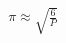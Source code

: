\documentclass[preview]{standalone}
\begin{document}
\begin{align*}
\pi \approx \sqrt{\frac{6}{P}}
\end{align*}
\end{document}
